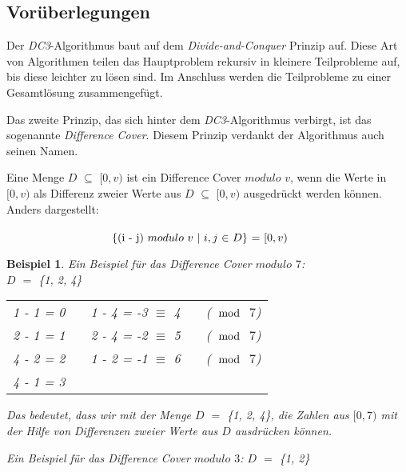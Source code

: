 \subsection{Vorüberlegungen}
\label{dc3:vorueberlegungen}

\newtheorem{example}{Beispiel}
Der \emph{DC3}-Algorithmus baut auf dem \emph{Divide-and-Conquer} Prinzip auf. Diese Art von Algorithmen teilen das Hauptproblem rekursiv in kleinere Teilprobleme auf, bis diese leichter zu lösen sind. Im Anschluss werden die Teilprobleme zu einer Gesamtlösung zusammengefügt.

Das zweite Prinzip, das sich hinter dem \emph{DC3}-Algorithmus verbirgt, ist das sogenannte \emph{Difference Cover}. Diesem Prinzip verdankt der Algorithmus auch seinen Namen.

\begin{definition}
	\label{def:differenceCover}
	Eine Menge \(D\) $\subseteq$ \([0,v)\) ist ein Difference Cover \(modulo\) \(v\), wenn die Werte in \([0,v)\) als Differenz zweier Werte aus \(D\) $\subseteq$ \([0,v)\) ausgedrückt werden können. Anders dargestellt:\\ \\
	$\makebox[\linewidth]{\{(i - j) \(modulo\) \(v\) $\mid$ $i,j$ $\in$ \(D\)\} $=$ \([0,v)\)}$
			
\end{definition}

\begin{example}
	Ein Beispiel für das Difference Cover \(modulo\) \(7\):\\
	\(D\) $=$ \{1, 2, 4\} 
	\begin{table}[!htbp]
		\centering
		\begin{tabular}{lllll}
			1 - 1 = 0 &  & 1 - 4 = -3 $\equiv$ 4 &  & (\(\mod\) \(7\))\\
			2 - 1 = 1 &  & 2 - 4 = -2 $\equiv$ 5 &  & (\(\mod\) \(7\))\\
			4 - 2 = 2 &  & 1 - 2 = -1 $\equiv$ 6 &  & (\(\mod\) \(7\))\\
			4 - 1 = 3 &  &                       &  & 
		\end{tabular}
	\end{table}
	
	Das bedeutet, dass wir mit der Menge \(D\) $=$ \{1, 2, 4\}, die Zahlen aus \([0,7)\) mit der Hilfe von Differenzen zweier Werte aus \(D\) ausdrücken können.
	
	Ein Beispiel für das Difference Cover \(modulo\) \(3\): \(D\) $=$ \{1, 2\} 
\end{example}
